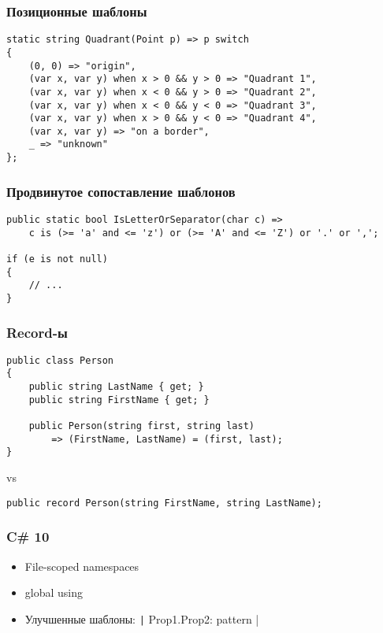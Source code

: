 \documentclass{../../slides-style}
\begin{document}
    \begin{frame}[fragile]
        \frametitle{Позиционные шаблоны}
        \begin{verbatim}
static string Quadrant(Point p) => p switch
{
    (0, 0) => "origin",
    (var x, var y) when x > 0 && y > 0 => "Quadrant 1",
    (var x, var y) when x < 0 && y > 0 => "Quadrant 2",
    (var x, var y) when x < 0 && y < 0 => "Quadrant 3",
    (var x, var y) when x > 0 && y < 0 => "Quadrant 4",
    (var x, var y) => "on a border",
    _ => "unknown"
};
        \end{verbatim}
    \end{frame}

    \begin{frame}[fragile]
        \frametitle{Продвинутое сопоставление шаблонов}
        \begin{verbatim}
public static bool IsLetterOrSeparator(char c) =>
    c is (>= 'a' and <= 'z') or (>= 'A' and <= 'Z') or '.' or ',';

if (e is not null)
{
    // ...
}
        \end{verbatim}
    \end{frame}

    \begin{frame}[fragile]
        \frametitle{Record-ы}
        \begin{verbatim}
public class Person
{
    public string LastName { get; }
    public string FirstName { get; }

    public Person(string first, string last) 
        => (FirstName, LastName) = (first, last);
}
        \end{verbatim}
        vs
        \begin{verbatim}
public record Person(string FirstName, string LastName);
        \end{verbatim}
    \end{frame}

    \begin{frame}[fragile]
        \frametitle{C\# 10}
        \begin{itemize}
            \item File-scoped namespaces
            \item global using
            \item Улучшенные шаблоны: \texttt|{ Prop1.Prop2: pattern }|
        \end{itemize}
    \end{frame}
\end{document}
